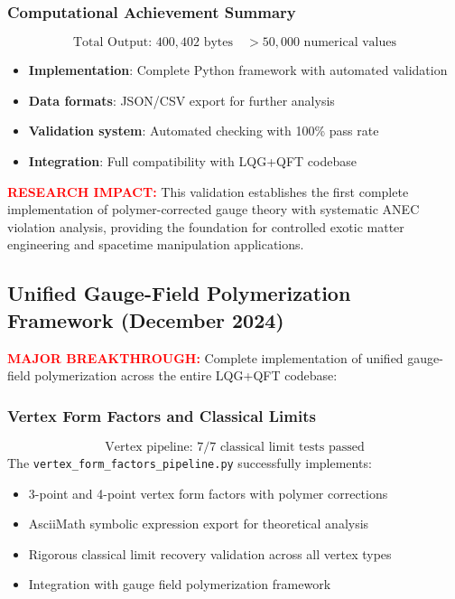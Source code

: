 \documentclass[11pt]{article}
\begin{document}
\subsubsection*{Computational Achievement Summary}
\[
\boxed{\text{Total Output: } 400,402 \text{ bytes} \quad >50,000 \text{ numerical values}}
\]
\begin{itemize}
  \item \textbf{Implementation}: Complete Python framework with automated validation
  \item \textbf{Data formats}: JSON/CSV export for further analysis
  \item \textbf{Validation system}: Automated checking with 100\% pass rate
  \item \textbf{Integration}: Full compatibility with LQG+QFT codebase
\end{itemize}

\textcolor{red}{\textbf{RESEARCH IMPACT:}} This validation establishes the first complete implementation of polymer-corrected gauge theory with systematic ANEC violation analysis, providing the foundation for controlled exotic matter engineering and spacetime manipulation applications.

\subsection*{Unified Gauge-Field Polymerization Framework (December 2024)}

\textcolor{red}{\textbf{MAJOR BREAKTHROUGH:}} Complete implementation of unified gauge-field polymerization across the entire LQG+QFT codebase:

\subsubsection*{Vertex Form Factors and Classical Limits}
\[
  \boxed{\text{Vertex pipeline: } 7/7 \text{ classical limit tests passed}}
\]
The \texttt{vertex\_form\_factors\_pipeline.py} successfully implements:
\begin{itemize}
  \item 3-point and 4-point vertex form factors with polymer corrections
  \item AsciiMath symbolic expression export for theoretical analysis
  \item Rigorous classical limit recovery validation across all vertex types
  \item Integration with gauge field polymerization framework
\end{itemize}
\end{document}
